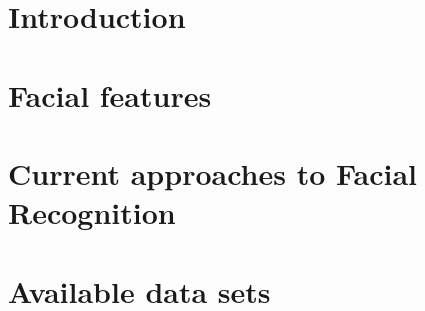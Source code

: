 
\chapter{Introduction}
\label{chapter:introduction}


\chapter{Facial features}
\label{chapter:features}


\chapter{Current approaches to Facial Recognition}
\label{chapter:research}


\chapter{Available data sets}
\label{chapter:datasets}





